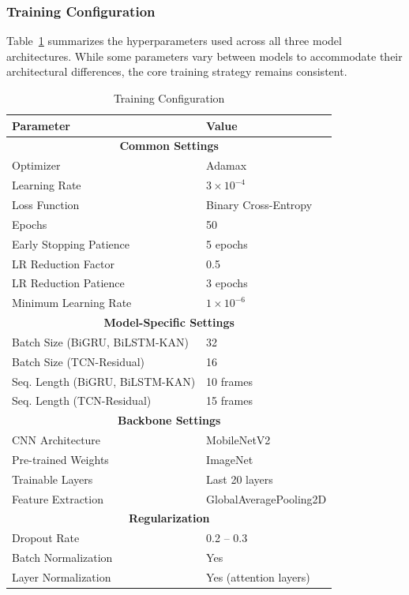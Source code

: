 \documentclass[conference]{IEEEtran}
\begin{document}
\subsubsection{Training Configuration}
\mbox{}

Table~\ref{tab:training_config} summarizes the hyperparameters used across all three model architectures. While some parameters vary between models to accommodate their architectural differences, the core training strategy remains consistent.

\begin{table}[htbp]
\centering
\caption{Training Configuration}
\label{tab:training_config}
\begin{tabular}{ll} %
\hline
\textbf{Parameter} & \textbf{Value} \\
\hline
\multicolumn{2}{c}{\textbf{Common Settings}} \\ %
\hline
Optimizer & Adamax \\
Learning Rate & $3 \times 10^{-4}$ \\
Loss Function & Binary Cross-Entropy \\
Epochs & 50 \\
Early Stopping Patience & 5 epochs \\
LR Reduction Factor & 0.5 \\
LR Reduction Patience & 3 epochs \\
Minimum Learning Rate & $1 \times 10^{-6}$ \\
\hline
\multicolumn{2}{c}{\textbf{Model-Specific Settings}} \\
\hline
Batch Size (BiGRU, BiLSTM-KAN) & 32 \\
Batch Size (TCN-Residual) & 16 \\
Seq. Length (BiGRU, BiLSTM-KAN) & 10 frames \\
Seq. Length (TCN-Residual) & 15 frames \\
\hline
\multicolumn{2}{c}{\textbf{Backbone Settings}} \\
\hline
CNN Architecture & MobileNetV2 \\
Pre-trained Weights & ImageNet \\
Trainable Layers & Last 20 layers \\
Feature Extraction & GlobalAveragePooling2D \\
\hline
\multicolumn{2}{c}{\textbf{Regularization}} \\
\hline
Dropout Rate & 0.2 -- 0.3 \\
Batch Normalization & Yes \\
Layer Normalization & Yes (attention layers) \\
\hline
\end{tabular}
\end{table}
\end{document}
